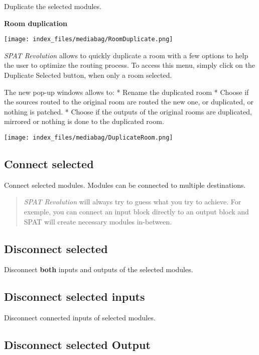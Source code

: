\documentclass[
  letterpaper,
  DIV=11,
  numbers=noendperiod]{scrreport}
\begin{document}
Duplicate the selected modules.

\textbf{Room duplication}

\texttt{[image: index\_files/mediabag/RoomDuplicate.png]}

\emph{SPAT Revolution} allows to quickly duplicate a room with a few
options to help the user to optimize the routing process. To access this
menu, simply click on the Duplicate Selected button, when only a room
selected.

The new pop-up windows allows to: * Rename the duplicated room * Choose
if the sources routed to the original room are routed the new one, or
duplicated, or nothing is patched. * Choose if the outputs of the
original rooms are duplicated, mirrored or nothing is done to the
duplicated room.

\texttt{[image: index\_files/mediabag/DuplicateRoom.png]}

\hypertarget{connect-selected}{%
\subsection{Connect selected}\label{connect-selected}}

Connect selected modules. Modules can be connected to multiple
destinations.

\begin{quote}
\emph{SPAT Revolution} will always try to guess what you try to achieve.
For exemple, you can connect an input block directly to an output block
and SPAT will create necessary modules in-between.
\end{quote}

\hypertarget{disconnect-selected}{%
\subsection{Disconnect selected}\label{disconnect-selected}}

Disconnect \textbf{both} inputs and outputs of the selected modules.

\hypertarget{disconnect-selected-inputs}{%
\subsection{Disconnect selected
inputs}\label{disconnect-selected-inputs}}

Disconnect connected inputs of selected modules.

\hypertarget{disconnect-selected-output}{%
\subsection{Disconnect selected
Output}\label{disconnect-selected-output}}
\end{document}
